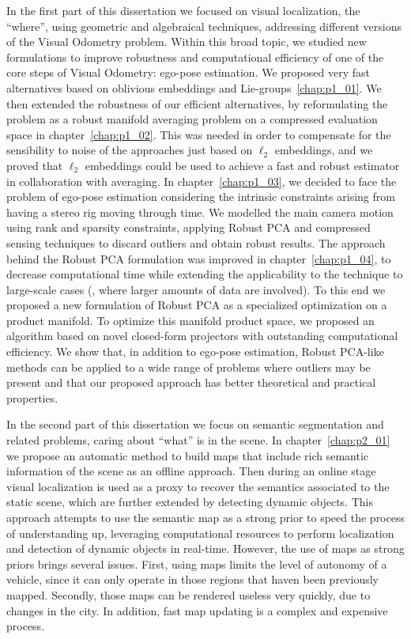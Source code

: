In the first part of this dissertation we focused on visual localization, the ``where'', using geometric and algebraical techniques, addressing different versions of the Visual Odometry problem. Within this broad topic, we studied new formulations to improve robustness and computational efficiency of one of the core steps of Visual Odometry: ego-pose estimation. We proposed very fast alternatives based on oblivious embeddings and Lie-groups~\ref{chap:p1_01}. We then extended the robustness of our efficient alternatives, by reformulating the problem as a robust manifold averaging problem on a compressed evaluation space in chapter~\ref{chap:p1_02}. This was needed in order to compensate for the sensibility to noise of the approaches just based on $\ell_2$ embeddings, and we proved that $\ell_2$ embeddings could be used to achieve a fast and robust estimator in collaboration with averaging. In chapter~\ref{chap:p1_03}, we decided to face the problem of ego-pose estimation considering the intrinsic constraints arising from having a stereo rig moving through time. We modelled the main camera motion using rank and sparsity constraints, applying Robust PCA and compressed sensing techniques to discard outliers and obtain robust results. The approach behind the Robust PCA formulation was improved in chapter~\ref{chap:p1_04}, to decrease computational time while extending the applicability to the technique to large-scale cases (\ie, where larger amounts of data are involved). To this end we proposed a new formulation of Robust PCA as a specialized optimization on a product manifold. To optimize this manifold product space, we proposed an algorithm based on novel closed-form projectors with outstanding computational efficiency. We show that, in addition to ego-pose estimation, Robust PCA-like methods can be applied to a wide range of problems where outliers may be present and that our proposed approach has better theoretical and practical properties.

In the second part of this dissertation we focus on semantic segmentation and related problems, caring about ``what'' is in the scene. In chapter~\ref{chap:p2_01} we propose an automatic method to build maps that include rich semantic information of the scene as an offline approach. Then during an online stage visual localization is used as a proxy to recover the semantics associated to the static scene, which are further extended by detecting dynamic objects. This approach attempts to use the semantic map as a strong prior to speed the process of understanding up, leveraging computational resources to perform localization and detection of dynamic objects in real-time. However, the use of maps as strong priors brings several issues. First, using maps limits the level of autonomy of a vehicle, since it can only operate in those regions that haven been previously mapped. Secondly, those maps can be rendered useless very quickly, due to changes in the city. In addition, fast map updating is a complex and expensive process. 

